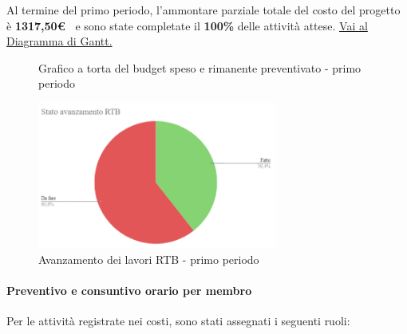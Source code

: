 Al termine del primo periodo, l'ammontare parziale totale del costo del progetto è \textbf{ 1317,50\euro\ } e sono state completate il \textbf{100\%} delle attività attese.
\href{https://github.com/orgs/ByteOps-swe/projects/3/views/1?sortedBy%5Bdirection%5D=asc&sortedBy%5BcolumnId%5D=64182560}{Vai al Diagramma di Gantt.}
\hspace{1pt}
  \begin{figure}[H]
    \centering
    \begin{minipage}[b]{0.45\textwidth}
        \centering
        \caption{Grafico a torta del budget speso e rimanente preventivato - primo periodo}
        \label{fig:Budget_speso_1}
    \end{minipage}
    
    \vspace{1cm}

    \begin{minipage}[b]{0.70\textwidth}
        \centering
        \includegraphics[width=0.7\textwidth]{../Images/avanzamento1Periodo.png}
        \caption{Avanzamento dei lavori RTB - primo periodo}
        \label{fig:Avanzamento_RTB_1}
    \end{minipage}
\end{figure}

\paragraph{Preventivo e consuntivo orario per membro}
Per le attività registrate nei costi, sono stati assegnati i seguenti ruoli: 

